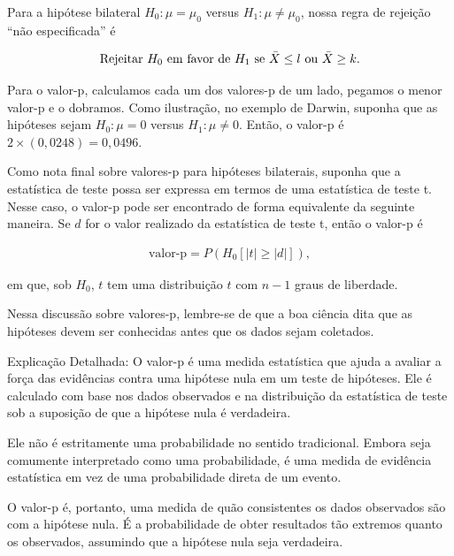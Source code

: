 \documentclass[12pt]{beamer}
\begin{document}
\begin{frame}{}
\begin{block}{}
\justifying
Para a hipótese bilateral $H_0 : \mu = \mu_0$ versus $H_1 : \mu \neq \mu_0$, nossa regra de rejeição ``não especificada'' é

\begin{align}
\text{Rejeitar } H_0 \text{ em favor de } H_1 \text{ se } \Bar{X} \leq l \text{ ou } \Bar{X} \geq k.
\end{align}

Para o valor-p, calculamos cada um dos valores-p de um lado, pegamos o menor valor-p e o dobramos. Como ilustração, no exemplo de Darwin, suponha que as hipóteses sejam $H_0 : \mu = 0$ versus $H_1 : \mu \neq 0$. Então, o valor-p é $2 \times (0,0248) = 0,0496$. 
\end{block}
\end{frame}

\begin{frame}{}
\begin{block}{}
\justifying
Como nota final sobre valores-p para hipóteses bilaterais, suponha que a estatística de teste possa ser expressa em termos de uma estatística de teste t. Nesse caso, o valor-p pode ser encontrado de forma equivalente da seguinte maneira. Se $d$ for o valor realizado da estatística de teste t, então o valor-p é

\begin{align}
\text{valor-p} = P(H_0 [|t| \geq |d|]), 
\end{align}

em que, sob $H_0$, $t$ tem uma distribuição $t$ com $n - 1$ graus de liberdade.
\end{block}
\pause
\begin{block}{}
\justifying
Nessa discussão sobre valores-p, lembre-se de que a boa ciência dita que as hipóteses devem ser conhecidas antes que os dados sejam coletados.
\end{block}
\end{frame}


\begin{frame}{}
\begin{block}{Explicação Detalhada:}
\justifying
O valor-p é uma medida estatística que ajuda a avaliar a força das evidências contra uma hipótese nula em um teste de hipóteses. Ele é calculado com base nos dados observados e na distribuição da estatística de teste sob a suposição de que a hipótese nula é verdadeira. 
\end{block}
\pause
\begin{block}{}
\justifying
Ele não é estritamente uma probabilidade no sentido tradicional. Embora seja comumente interpretado como uma probabilidade, é uma medida de evidência estatística em vez de uma probabilidade direta de um evento.
\end{block}
\pause
\begin{block}{}
\justifying
O valor-p é, portanto, uma medida de quão consistentes os dados observados são com a hipótese nula. É a probabilidade de obter resultados tão extremos quanto os observados, assumindo que a hipótese nula seja verdadeira.
\end{block}
\end{frame}
\end{document}

